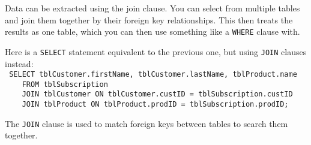 \documentclass[../main.tex]{subfile}
\begin{document}

Data can be extracted using the join clause. You can select from multiple tables and join them together by their foreign key relationships. This then treats the results as one table, which you can then use something like a \texttt{WHERE} clause with.

Here is a \texttt{SELECT} statement equivalent to the previous one, but using \texttt{JOIN} clauses instead:\\
\texttt{
SELECT tblCustomer.firstName, tblCustomer.lastName, tblProduct.name\\
    FROM tblSubscription\\
    JOIN tblCustomer ON tblCustomer.custID = tblSubscription.custID\\
    JOIN tblProduct ON tblProduct.prodID = tblSubscription.prodID;
}

The \texttt{JOIN} clause is used to match foreign keys between tables to search them together.
\end{document}
